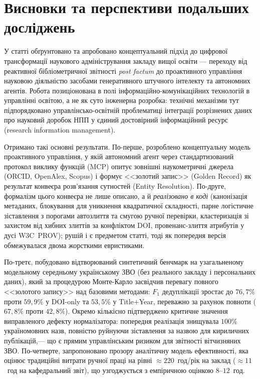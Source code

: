 \section*{Висновки та перспективи подальших досліджень}

У статті обґрунтовано та апробовано концептуальний підхід до цифрової трансформації наукового адміністрування закладу вищої освіти --- переходу від реактивної бібліометричної звітності \emph{post factum} до проактивного управління науковою діяльністю засобами генеративного штучного інтелекту та автономних агентів. Робота позиціонована в полі інформаційно-комунікаційних технологій в управлінні освітою, а не як суто інженерна розробка: технічні механізми тут підпорядковано управлінсько-освітній проблематиці інтеграції розрізнених даних про науковий доробок НПП у єдиний достовірний інформаційний ресурс (research information management).

Отримано такі основні результати. По-перше, розроблено концептуальну модель проактивного управління, у якій автономний агент через стандартизований протокол виклику функцій (MCP) опитує зовнішні наукометричні джерела (ORCID, OpenAlex, Scopus) і формує <<золотий запис>> (Golden Record) як результат конвеєра розв'язання сутностей (Entity Resolution). По-друге, формалізм цього конвеєра не лише описано, а й \emph{реалізовано в коді} (канонізація метаданих, блокування для уникнення квадратичної складності, парне логістичне зіставлення з порогами автозлиття та смугою ручної перевірки, кластеризація зі захистом від хибних злиттів за конфліктом DOI, провенанс-злиття атрибутів у дусі W3C~PROV); рушій і є предметом статті, тоді як попередня версія обмежувалася двома жорсткими евристиками.

По-третє, побудовано відтворюваний синтетичний бенчмарк на узагальненому модельному середньому українському ЗВО (без реального закладу і персональних даних), який за процедурою Монте-Карло засвідчив перевагу повного <<золотого запису>> над базовими методами: $F_1$ дедуплікації зростає до $76{,}7\%$ проти $59{,}9\%$ у DOI-only та $53{,}5\%$ у Title$+$Year, переважно за рахунок повноти ($67{,}8\%$ проти $42{,}8\%$). Окремо кількісно підтверджено критичне значення виправленого дефекту нормалізатора: попередня реалізація знищувала $100\%$ україномовних назв, повністю руйнуючи зіставлення за назвою для кириличних публікацій,--- що є прямим управлінським ризиком для звітності вітчизняних ЗВО. По-четверте, запропоновано прозору аналітичну модель ефективності, яка оцінює традиційні витрати ручної праці на рівні $\approx 220$~год/рік на заклад ($\approx 11$~год на кафедральний звіт), що узгоджується з емпіричною оцінкою $8$--$12$~год.

